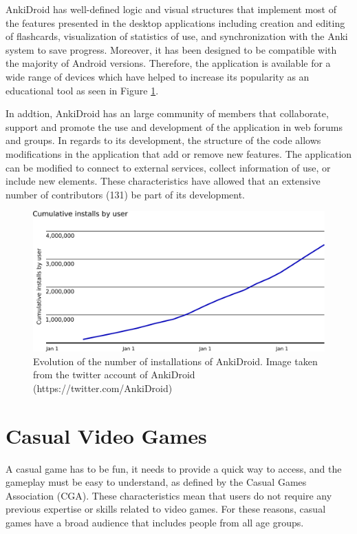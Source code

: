 AnkiDroid has well-defined logic and visual structures \citep{zamora2011ankidroid} that implement most of the features presented in the desktop applications including creation and editing of flashcards, visualization of statistics of use, and synchronization with the Anki system to save progress. Moreover, it has been designed to be compatible with the majority of Android versions. Therefore, the application is available for a wide range of devices which have helped to increase its popularity as an educational tool as seen in Figure \ref{fig:anki-evolution}.

In addtion, AnkiDroid has an large community of members that collaborate, support and promote the use and development of the application in web forums and groups. In regards to its development, the structure of the code allows modifications in the application that add or remove new features. The application can be modified to connect to external services, collect information of use, or include new elements. These characteristics have allowed that an extensive number of contributors (131) be part of its development.

\begin{figure}[htb]
    \vskip 5mm
        \begin{center}
            \includegraphics[scale=0.4]{./Figures/anki_progress.png}
            \caption{Evolution of the number of installations of AnkiDroid. Image taken from the twitter account of AnkiDroid (https://twitter.com/AnkiDroid)}
            \label{fig:anki-evolution}
        \end{center}
    \vskip -5mm
\end{figure}


\section{Casual Video Games}
A casual game has to be fun, it needs to provide a quick way to access, and the gameplay must be easy to understand, as defined by the Casual Games Association (CGA). These characteristics mean that users do not require any previous expertise or skills related to video games. For these reasons, casual games have a broad audience that includes people from all age groups.

